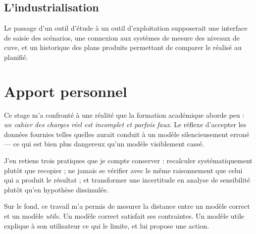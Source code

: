 \subsection{L'industrialisation}

Le passage d'un outil d'étude à un outil d'exploitation supposerait une interface de saisie
des scénarios, une connexion aux systèmes de mesure des niveaux de cuve, et un historique
des plans produits permettant de comparer le réalisé au planifié.

\section{Apport personnel}

Ce stage m'a confronté à une réalité que la formation académique aborde peu : \emph{un cahier
des charges réel est incomplet et parfois faux}. Le réflexe d'accepter les données fournies
telles quelles aurait conduit à un modèle silencieusement erroné --- ce qui est bien plus
dangereux qu'un modèle visiblement cassé.

J'en retiens trois pratiques que je compte conserver : recalculer systématiquement plutôt
que recopier ; ne jamais se vérifier avec le même raisonnement que celui qui a produit le
résultat ; et transformer une incertitude en analyse de sensibilité plutôt qu'en hypothèse
dissimulée.

Sur le fond, ce travail m'a permis de mesurer la distance entre un modèle correct et un
modèle \emph{utile}. Un modèle correct satisfait ses contraintes. Un modèle utile explique à
son utilisateur ce qui le limite, et lui propose une action.
